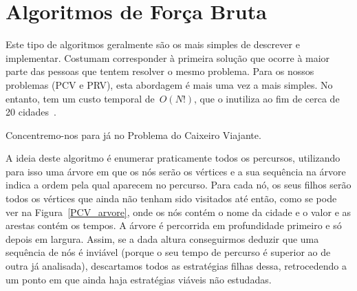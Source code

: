 \documentclass[12pt,a4paper,reqno]{report}
\numberwithin{equation}{section}
\begin{document}
\section{Algoritmos de Força Bruta}

Este tipo de algoritmos geralmente são os mais simples de descrever e implementar. Costumam corresponder à primeira solução que ocorre à maior parte das pessoas que tentem resolver o mesmo problema. Para os nossos problemas (PCV e PRV), esta abordagem é mais uma vez a mais simples. No entanto, tem um custo temporal de~$O(N!)$, que o inutiliza ao fim de cerca de 20 cidades~\cite{wiki_tsp}.

Concentremo-nos para já no Problema do Caixeiro Viajante.

A ideia deste algoritmo é enumerar praticamente todos os percursos, utilizando para isso uma árvore em que os nós serão os vértices e a sua sequência na árvore indica a ordem pela qual aparecem no percurso. Para cada nó, os seus filhos serão todos os vértices que ainda não tenham sido visitados até então, como se pode ver na Figura~\ref{PCV_arvore}, onde os nós contém o nome da cidade e o valor e as arestas contém os tempos. A árvore é percorrida em profundidade primeiro e só depois em largura. Assim, se a dada altura conseguirmos deduzir que uma sequência de nós é inviável (porque o seu tempo de percurso é superior ao de outra já analisada), descartamos todos as estratégias filhas dessa, retrocedendo a um ponto em que ainda haja estratégias viáveis não estudadas. 
\end{document}
